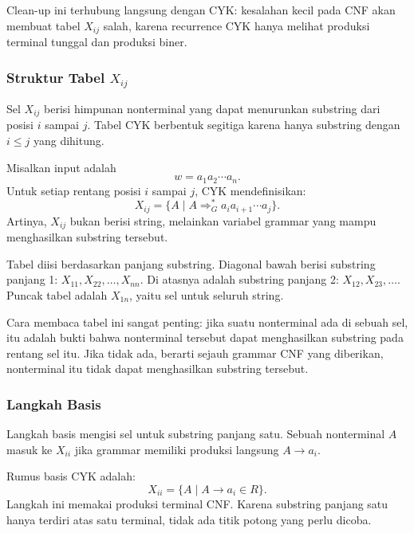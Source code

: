 Clean-up ini terhubung langsung dengan CYK: kesalahan kecil pada CNF akan membuat tabel $X_{ij}$ salah, karena recurrence CYK hanya melihat produksi terminal tunggal dan produksi biner.

\subsubsection{\texorpdfstring{Struktur Tabel $X_{ij}$}{Struktur Tabel Xij}}

\begin{jawab}
Sel $X_{ij}$ berisi himpunan nonterminal yang dapat menurunkan substring dari posisi $i$ sampai $j$. Tabel CYK berbentuk segitiga karena hanya substring dengan $i\leq j$ yang dihitung.
\end{jawab}

Misalkan input adalah
\[
    w=a_1a_2\cdots a_n.
\]
Untuk setiap rentang posisi $i$ sampai $j$, CYK mendefinisikan:
\[
    X_{ij}=\{A\mid A\Rightarrow_G^* a_i a_{i+1}\cdots a_j\}.
\]
Artinya, $X_{ij}$ bukan berisi string, melainkan variabel grammar yang mampu menghasilkan substring tersebut.

Tabel diisi berdasarkan panjang substring. Diagonal bawah berisi substring panjang 1: $X_{11},X_{22},\ldots,X_{nn}$. Di atasnya adalah substring panjang 2: $X_{12},X_{23},\ldots$. Puncak tabel adalah $X_{1n}$, yaitu sel untuk seluruh string.

Cara membaca tabel ini sangat penting: jika suatu nonterminal ada di sebuah sel, itu adalah bukti bahwa nonterminal tersebut dapat menghasilkan substring pada rentang sel itu. Jika tidak ada, berarti sejauh grammar CNF yang diberikan, nonterminal itu tidak dapat menghasilkan substring tersebut.

\subsubsection{Langkah Basis}

\begin{jawab}
Langkah basis mengisi sel untuk substring panjang satu. Sebuah nonterminal $A$ masuk ke $X_{ii}$ jika grammar memiliki produksi langsung $A\rightarrow a_i$.
\end{jawab}

Rumus basis CYK adalah:
\[
    X_{ii}=\{A\mid A\rightarrow a_i \in R\}.
\]
Langkah ini memakai produksi terminal CNF. Karena substring panjang satu hanya terdiri atas satu terminal, tidak ada titik potong yang perlu dicoba.

